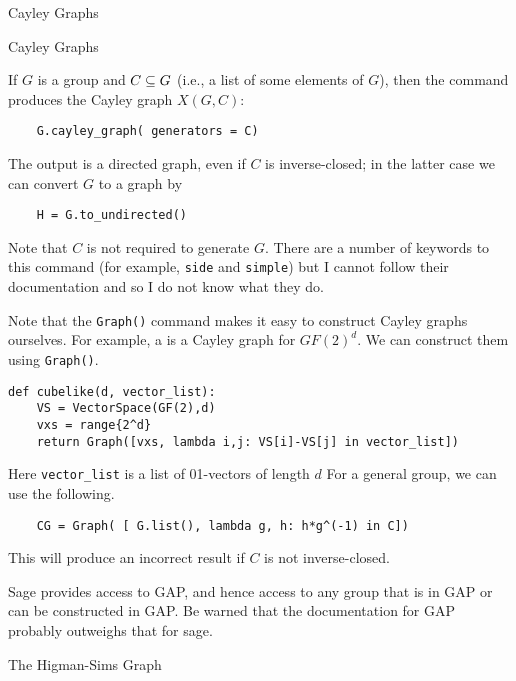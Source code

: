 \begin{chap}{Cayley Graphs}
%
\begin{sect}{Cayley Graphs}
\begin{para}
If $G$ is a group and $C\subseteq G$ (i.e., a list of some elements of $G$), then the 
command produces the Cayley graph $X(G,C)$:
\end{para}
%
\begin{verbatim}
    G.cayley_graph( generators = C)
\end{verbatim}
%
\begin{para}
The output is a directed graph, even if $C$ is inverse-closed; in the latter
case we can convert $G$ to a graph by
\end{para}
%
\begin{verbatim}
    H = G.to_undirected()
\end{verbatim}
%
\begin{para}
Note that $C$ is not required to generate $G$. There are a number of keywords
to this command (for example, \texttt{side} and \texttt{simple}) but I cannot
follow their documentation and so I do not know what they do.
\end{para}
%
\begin{para}
Note that the \texttt{Graph()} command makes it easy to construct Cayley
graphs ourselves. For example, a  is a Cayley
graph for $GF(2)^d$. We can construct them using \texttt{Graph()}.
\end{para}
%
\begin{verbatim}
def cubelike(d, vector_list):
    VS = VectorSpace(GF(2),d)
    vxs = range{2^d}
    return Graph([vxs, lambda i,j: VS[i]-VS[j] in vector_list])
\end{verbatim}
%
\begin{para}
Here \verb|vector_list| is a list of 01-vectors of length $d$
For a general group, we can use the following.
\end{para}
%
\begin{verbatim}
    CG = Graph( [ G.list(), lambda g, h: h*g^(-1) in C])
\end{verbatim}
This will produce an incorrect result if $C$ is not inverse-closed.
%
\begin{para}
Sage provides access to GAP, and hence access to any group that is
in GAP or can be constructed in GAP.  Be warned that the documentation
for GAP probably outweighs that for sage.
\end{para}
%
\end{sect}
%
\begin{sect}{The Higman-Sims Graph}

\end{sect}
\end{chap}
